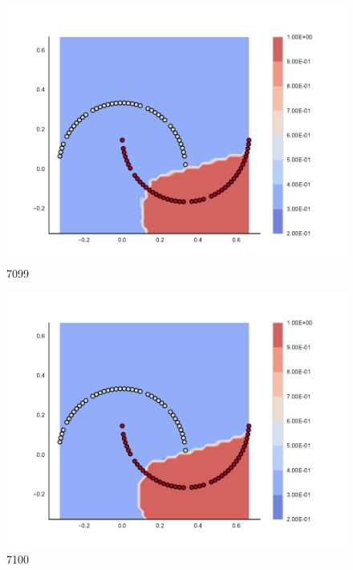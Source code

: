 \begin{subfigure}[b]{0.09\textwidth}
    \includegraphics[clip, trim=2.35cm 1.75cm 4.5cm 0cm,width=\textwidth]{img/convergence/7099.pdf}
    \caption{7099}
    \label{fig:convergence_7099}
\end{subfigure}
%
\begin{subfigure}[b]{0.09\textwidth}
    \includegraphics[clip, trim=2.35cm 1.75cm 4.5cm 0cm,width=\textwidth]{img/convergence/7100.pdf}
    \caption{7100}
    \label{fig:convergence_7100}
\end{subfigure}
%
